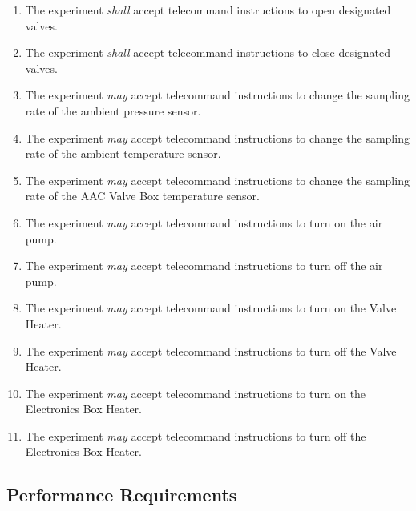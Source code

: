 \documentclass[a4paper,12pt,twoside]{article}
\begin{document}
\begin{enumerate}[label=F.\arabic*]
    \item The experiment \textit{shall} accept telecommand instructions to open designated valves.
    \item The experiment \textit{shall} accept telecommand instructions to close designated valves.
    \item The experiment \textit{may} accept telecommand instructions to change the sampling rate of the ambient pressure sensor.
    \item The experiment \textit{may} accept telecommand instructions to change the sampling rate of the ambient temperature sensor.
    \item The experiment \textit{may} accept telecommand instructions to change the sampling rate of the AAC Valve Box temperature sensor.
    \item The experiment \textit{may} accept telecommand instructions to turn on the air pump.
    \item The experiment \textit{may} accept telecommand instructions to turn off the air pump.
    \item The experiment \textit{may} accept telecommand instructions to turn on the Valve Heater.
    \item The experiment \textit{may} accept telecommand instructions to turn off the Valve Heater.
    \item The experiment \textit{may} accept telecommand instructions to turn on the Electronics Box Heater.
    \item The experiment \textit{may} accept telecommand instructions to turn off the Electronics Box Heater.
\end{enumerate}
\pagebreak
\subsection{Performance Requirements}
\end{document}

